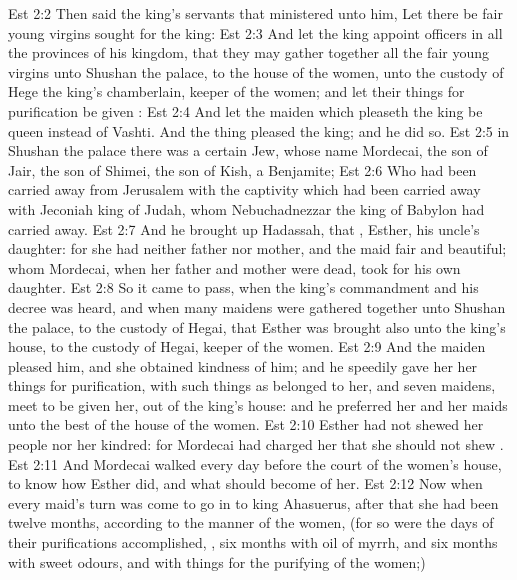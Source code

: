 \vs Est 2:2 Then said the king's servants that ministered unto him, Let there be fair young virgins sought for the king:
\vs Est 2:3 And let the king appoint officers in all the provinces of his kingdom, that they may gather together all the fair young virgins unto Shushan the palace, to the house of the women, unto the custody of Hege the king's chamberlain, keeper of the women; and let their things for purification be given :
\vs Est 2:4 And let the maiden which pleaseth the king be queen instead of Vashti. And the thing pleased the king; and he did so.
\vs Est 2:5  in Shushan the palace there was a certain Jew, whose name  Mordecai, the son of Jair, the son of Shimei, the son of Kish, a Benjamite;
\vs Est 2:6 Who had been carried away from Jerusalem with the captivity which had been carried away with Jeconiah king of Judah, whom Nebuchadnezzar the king of Babylon had carried away.
\vs Est 2:7 And he brought up Hadassah, that , Esther, his uncle's daughter: for she had neither father nor mother, and the maid  fair and beautiful; whom Mordecai, when her father and mother were dead, took for his own daughter.
\vs Est 2:8 So it came to pass, when the king's commandment and his decree was heard, and when many maidens were gathered together unto Shushan the palace, to the custody of Hegai, that Esther was brought also unto the king's house, to the custody of Hegai, keeper of the women.
\vs Est 2:9 And the maiden pleased him, and she obtained kindness of him; and he speedily gave her her things for purification, with such things as belonged to her, and seven maidens,  meet to be given her, out of the king's house: and he preferred her and her maids unto the best  of the house of the women.
\vs Est 2:10 Esther had not shewed her people nor her kindred: for Mordecai had charged her that she should not shew .
\vs Est 2:11 And Mordecai walked every day before the court of the women's house, to know how Esther did, and what should become of her.
\vs Est 2:12 Now when every maid's turn was come to go in to king Ahasuerus, after that she had been twelve months, according to the manner of the women, (for so were the days of their purifications accomplished, , six months with oil of myrrh, and six months with sweet odours, and with  things for the purifying of the women;)
